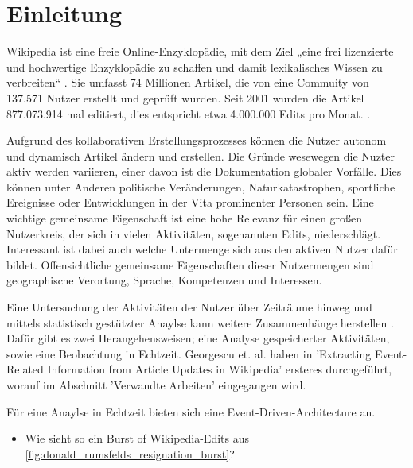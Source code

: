 \section{Einleitung}
Wikipedia ist eine freie Online-Enzyklopädie, mit dem Ziel „eine frei lizenzierte und hochwertige Enzyklopädie zu schaffen und damit lexikalisches Wissen zu verbreiten“ \cite{wales.}. Sie umfasst 74 Millionen Artikel, die von eine Commuity von 137.571 Nutzer erstellt und geprüft wurden. Seit 2001 wurden die Artikel 877.073.914 mal editiert, dies entspricht etwa 4.000.000 Edits pro Monat. \cite{wikistat}.

Aufgrund des kollaborativen Erstellungsprozesses können die Nutzer autonom und dynamisch Artikel ändern und erstellen. \cite{wikipedia.}
Die Gründe wesewegen die Nuzter aktiv werden variieren, einer davon ist die Dokumentation globaler Vorfälle. Dies können unter Anderen politische Veränderungen, Naturkatastrophen, sportliche Ereignisse oder Entwicklungen in der Vita prominenter Personen sein. Eine wichtige gemeinsame Eigenschaft ist eine hohe Relevanz für einen großen Nutzerkreis, der sich in vielen Aktivitäten, sogenannten Edits, niederschlägt. Interessant ist dabei auch welche Untermenge sich aus den aktiven Nutzer dafür bildet. Offensichtliche gemeinsame Eigenschaften dieser Nutzermengen sind geographische Verortung, Sprache, Kompetenzen und Interessen. 

Eine Untersuchung der Aktivitäten der Nutzer über Zeiträume hinweg und mittels statistisch gestützter Anaylse kann weitere Zusammenhänge herstellen \cite{10.1007978-3-642-36973-5_22}. Dafür gibt es zwei Herangehensweisen; eine Analyse gespeicherter Aktivitäten, sowie eine Beobachtung in Echtzeit. Georgescu et. al. haben in 'Extracting Event-Related Information from Article Updates in Wikipedia' ersteres durchgeführt, worauf im Abschnitt 'Verwandte Arbeiten' eingegangen wird. 

Für eine Anaylse in Echtzeit bieten sich eine Event-Driven-Architecture an. 

\begin{itemize}

    \begin{itemize}
        \item Für eine Entität (z.\,B. eine Person des öffentlichen Lebens) aus der Gesamtheit der Wikipedia-Edit-Events in "Echtzeit"
        Events der realen Welt ableiten.
        \item Wir betrachten nur die Metadaten (Zeitstempel, Autor, ...) und nicht den Inhalt der Änderung Änderung (z.\,B. textuelle Änderung).
        \item ...
    \end{itemize}
    \item Wie sieht so ein Burst of Wikipedia-Edits aus \ref{fig:donald_rumsfelds_resignation_burst}?
\end{itemize}


